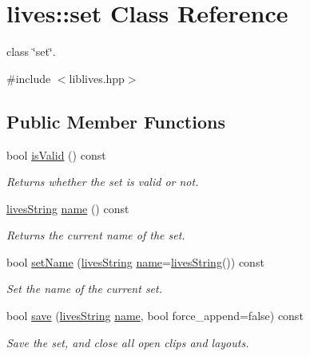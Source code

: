 \hypertarget{classlives_1_1set}{\section{lives\-:\-:set Class Reference}
\label{classlives_1_1set}
}


class \char`\"{}set\char`\"{}.  




{\ttfamily \#include $<$liblives.\-hpp$>$}

\subsection*{Public Member Functions}
\begin{DoxyCompactItemize}
\item 
bool \hyperlink{classlives_1_1set_a7dce9a311214deb022cd2d2679db7631}{is\-Valid} () const 
\begin{DoxyCompactList}\small\item\em Returns whether the set is valid or not. \end{DoxyCompactList}\item 
\hyperlink{classlives_1_1livesString}{lives\-String} \hyperlink{classlives_1_1set_a800ff7b6410dacdf6a4a7bf164b30709}{name} () const 
\begin{DoxyCompactList}\small\item\em Returns the current name of the set. \end{DoxyCompactList}\item 
bool \hyperlink{classlives_1_1set_a1e41621e140c4770bc502b13b582c6b9}{set\-Name} (\hyperlink{classlives_1_1livesString}{lives\-String} \hyperlink{classlives_1_1set_a800ff7b6410dacdf6a4a7bf164b30709}{name}=\hyperlink{classlives_1_1livesString}{lives\-String}()) const 
\begin{DoxyCompactList}\small\item\em Set the name of the current set. \end{DoxyCompactList}\item 
bool \hyperlink{classlives_1_1set_ae99f4b628a6a7a244923c7e9816523e6}{save} (\hyperlink{classlives_1_1livesString}{lives\-String} \hyperlink{classlives_1_1set_a800ff7b6410dacdf6a4a7bf164b30709}{name}, bool force\-\_\-append=false) const 
\begin{DoxyCompactList}\small\item\em Save the set, and close all open clips and layouts. \end{DoxyCompactList}\item 

\end{DoxyCompactItemize}
